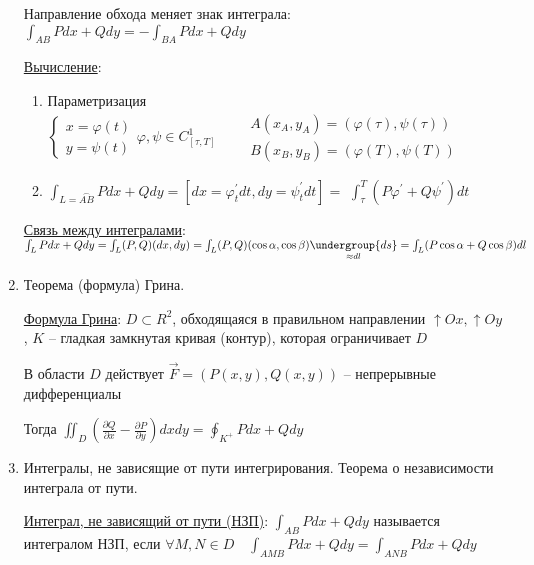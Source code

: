 \documentclass[12pt]{article}
\begin{document}
\begin{enumerate}
        Направление обхода меняет знак интеграла: $\int_{AB}Pdx + Qdy = -\int_{BA}Pdx + Qdy$

        \hyperlink{curvilinearintegraloffirstkindcalculation}{Вычисление}:

        \begin{enumerate}
            \item Параметризация $\begin{cases}
                x = \varphi(t) \\
                y = \psi(t)
            \end{cases} \varphi, \psi \in C^1_{[\tau, T]} \quad\quad \begin{matrix}
                A(x_A, y_A) = (\varphi(\tau), \psi(\tau)) \\
                B(x_B, y_B) = (\varphi(T), \psi(T))
            \end{matrix}$

            \item $\int_{L = \overset{\frown}{AB}}Pdx + Qdy = [dx = \varphi_t^\prime dt, dy = \psi_t^\prime dt] = $
            $\int_\tau^T (P\varphi^\prime + Q\psi^\prime)dt$
        \end{enumerate}


        \hyperlink{connectionbetweencurvilinearintegrals}{Связь между интегралами}: $\int_L Pdx + Qdy = \int_L (P, Q)(dx, dy) = \int_L (P, Q) (\cos\alpha, \cos\beta) \underset{\approx dl}{\undergroup{ds}} = \int_L (P\cos\alpha + Q\cos\beta)dl$

        \item Теорема (формула) Грина.

        \hyperlink{formulaGreen}{Формула Грина}: $D \subset R^2$, обходящаяся в правильном направлении $\uparrow Ox, \uparrow Oy$, $K$ -- гладкая замкнутая кривая (контур), которая ограничивает $D$

        В области $D$ действует $\overrightarrow{F} = (P(x, y), Q(x, y))$ -- непрерывные дифференциалы

        Тогда $\iint_D \left(\frac{\partial Q}{\partial x} - \frac{\partial P}{\partial y}\right) dxdy = \oint_{K^+} Pdx + Qdy$

        \item Интегралы, не зависящие от пути интегрирования. Теорема о независимости интеграла от пути.

        \hyperlink{pathindependentintegrals}{Интеграл, не зависящий от пути (НЗП)}: $\int_{AB}Pdx + Qdy$ называется интегралом НЗП, если $\forall M, N \in D \quad \int_{AMB}Pdx + Qdy = \int_{ANB}Pdx + Qdy$


\end{enumerate}
\end{document}
